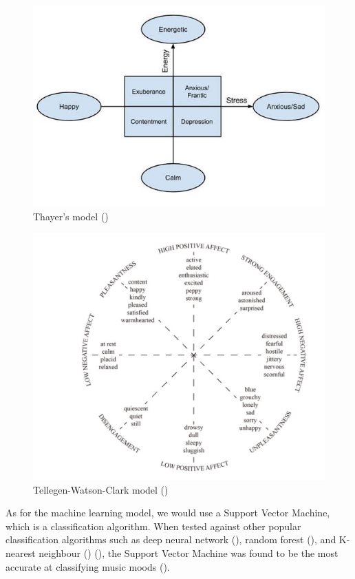 \begin{figure}
    \centering
    \includegraphics[scale=0.4]{Figures/Thayers model}
    \decoRule
    \caption{Thayer's model (\cite{circumplexbook})}
    \label{fig:Thayers}
    \end{figure}

\begin{figure}
    \centering
    \includegraphics[scale=0.4]{Figures/TWC model}
    \decoRule
    \caption{Tellegen-Watson-Clark model (\cite{MoodIoT})}
    \label{fig:TWC}
    \end{figure}

As for the machine learning model, we would use a Support Vector Machine, which is a classification algorithm. When tested against other popular classification algorithms such as deep neural network (\cite{MoodDeepNeuralNetwork}), random forest (\cite{Moodrandomforest}), and K-nearest neighbour (\cite{MoodKNeighbour}) (\cite{MoodDeepNeuralNetwork}), the Support Vector Machine was found to be the most accurate at classifying music moods (\cite{MoodIoT}).

